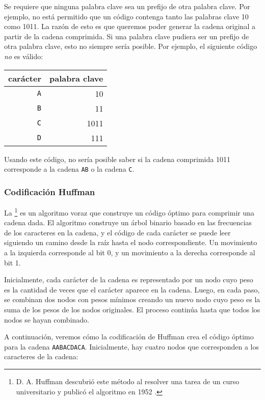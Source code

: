Se requiere que ninguna palabra clave
sea un prefijo de otra palabra clave.
Por ejemplo, no está permitido que un código
contenga tanto las palabras clave 10
como 1011.
La razón de esto es que queremos
poder generar la cadena original
a partir de la cadena comprimida.
Si una palabra clave pudiera ser un prefijo de otra palabra clave,
esto no siempre sería posible.
Por ejemplo, el siguiente código \emph{no} es válido:
\begin{center}
    \begin{tabular}{rr}
        carácter   & palabra clave \\
        \hline
        \texttt{A} & 10            \\
        \texttt{B} & 11            \\
        \texttt{C} & 1011          \\
        \texttt{D} & 111           \\
    \end{tabular}
\end{center}
Usando este código, no sería posible saber
si la cadena comprimida 1011 corresponde a
la cadena \texttt{AB} o la cadena \texttt{C}.


\subsubsection{Codificación Huffman}

La \footnote{D. A. Huffman descubrió este método
    al resolver una tarea de un curso universitario
    y publicó el algoritmo en 1952 \cite{huf52}.} es un algoritmo voraz
que construye un código óptimo para
comprimir una cadena dada.
El algoritmo construye un árbol binario
basado en las frecuencias de los caracteres
en la cadena,
y el código de cada carácter se puede leer
siguiendo un camino desde la raíz hasta
el nodo correspondiente.
Un movimiento a la izquierda corresponde al bit 0,
y un movimiento a la derecha corresponde al bit 1.

Inicialmente, cada carácter de la cadena es
representado por un nodo cuyo peso es la
cantidad de veces que el carácter aparece en la cadena.
Luego, en cada paso, se combinan dos nodos con pesos mínimos
creando un nuevo nodo cuyo peso es la suma de los pesos
de los nodos originales.
El proceso continúa hasta que todos los nodos se hayan combinado.

A continuación, veremos cómo la codificación de Huffman crea
el código óptimo para la cadena
\texttt{AABACDACA}.
Inicialmente, hay cuatro nodos que corresponden
a los caracteres de la cadena:

